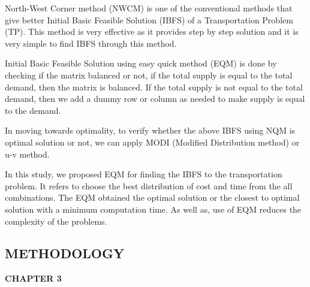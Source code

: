 \documentclass{article}
\begin{document}
{North-West Corner method (NWCM) is one of the conventional methods that give better Initial Basic Feasible Solution (IBFS) of a Transportation Problem (TP). This method is very effective as it provides step by step solution and it is very simple to find IBFS through this method.

Initial Basic Feasible Solution using easy quick method (EQM) is done by checking if the matrix balanced or not, if the total supply is equal to the total demand, then the matrix is balanced. If the total supply is not equal to the total demand, then we add a dummy row or column as needed to make supply is equal to the demand.

In moving towards optimality, to verify whether the above IBFS using NQM is optimal solution or not, we can apply MODI (Modified Distribution method) or u-v method. \break

In this study, we proposed EQM for finding the IBFS to the transportation problem. It refers to choose the best distribution of cost and time from the all combinations. The EQM obtained the optimal solution or the closest to optimal solution with a minimum computation time. As well as, use of EQM reduces the complexity of the problems.}

\newpage

\begin{center}
	\section{METHODOLOGY}
	\textbf{CHAPTER 3}
\end{center}
\end{document}
